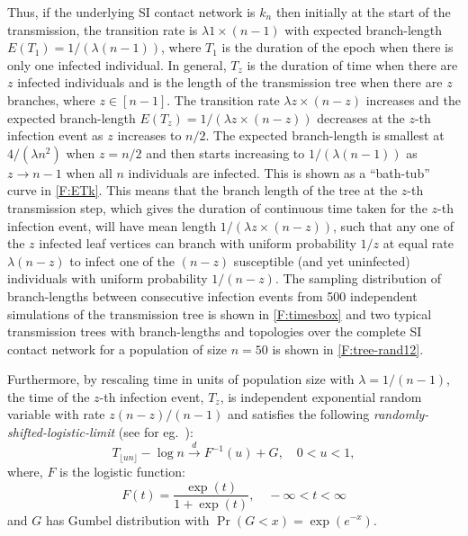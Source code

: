 \documentclass[review]{elsarticle}
\numberwithin{equation}{section}
\let\orgautoref\autoref
\renewcommand{\autoref}
        {\def\equationautorefname{Eq.}%
         \def\figureautorefname{Fig.}%
         \def\subfigureautorefname{Fig.}%
         \def\sectionautorefname{Sect.}%
         \def\subsectionautorefname{Sect.}%
         \def\subsubsectionautorefname{Sect.}%
         \def\Itemautorefname{item}%
         \def\tableautorefname{Table}%
         \def\propositionautorefname{Prop.}%
         \def\corollaryautorefname{Corollary}%
         \def\theoremautorefname{Theorem}%
         \def\remarkautorefname{Remark}%
         \def\lemmaautorefname{Lemma}%
         \def\proofofautorefname{Proof}%
         \def\exampleautorefname{Example}%
         \orgautoref}
\begin{document}
Thus, if the underlying SI contact network is $k_n$ then 
initially at the start of the transmission, the transition rate is $\lambda 1\times(n-1)$ 
with expected branch-length $E(T_1)=1/(\lambda (n-1))$, where $T_1$ is the duration of the epoch when there is only one infected individual.  
In general, $T_z$ is the duration of time when there are $z$ infected individuals and is the length of the transmission tree when there are $z$ branches, where $z \in [n-1]$.  
The transition rate $\lambda z \times (n-z)$ increases and the expected branch-length 
$E(T_z)=1/(\lambda z \times (n-z))$ decreases at the 
$z$-th infection event as $z$ increases to $n/2$.  
The expected branch-length is smallest at $4/(\lambda n^2)$ when $z=n/2$ and then starts increasing to $1/(\lambda (n-1))$ as $z \to n-1$ when all $n$ individuals are infected.  
This is shown as a ``bath-tub'' curve in \autoref{F:ETk}.  
This means that the branch length of the tree at the $z$-th transmission step, 
which gives the duration of continuous time taken for the $z$-th infection event, 
will have mean length $1/(\lambda z \times(n-z))$, 
such that any one of the $z$ infected leaf vertices can branch with uniform probability $1/z$ at equal rate $\lambda (n-z)$ to infect one of the $(n-z)$ susceptible (and yet uninfected) individuals with uniform probability $1/(n-z)$.  
The sampling distribution of branch-lengths between consecutive infection events from 500 independent simulations of the transmission tree is shown in \autoref{F:timesbox} and two typical transmission trees with branch-lengths and topologies over the complete SI contact network for a population of size $n=50$ is shown in \autoref{F:tree-rand12}.

Furthermore, by rescaling time in units of population size with $\lambda=1/(n-1)$, the 
time of the $z$-th infection event, $T_z$, is independent exponential random variable with rate $z(n-z)/(n-1)$ and satisfies the following {\em randomly-shifted-logistic-limit} (see for eg.~\cite[Eq. 7.13]{AldousIPSSSD2013}):
\[
T_{\lfloor un \rfloor} - \log n \overset{d}{\rightarrow} F^{-1}(u) + G, \quad 0<u<1,
\]
where, $F$ is the logistic function:
\[
F(t) = \frac{\exp(t)}{1+\exp(t)}, \quad -\infty < t < \infty
\]
and $G$ has Gumbel distribution with $\Pr(G<x)=\exp(e^{-x})$.
\end{document}
